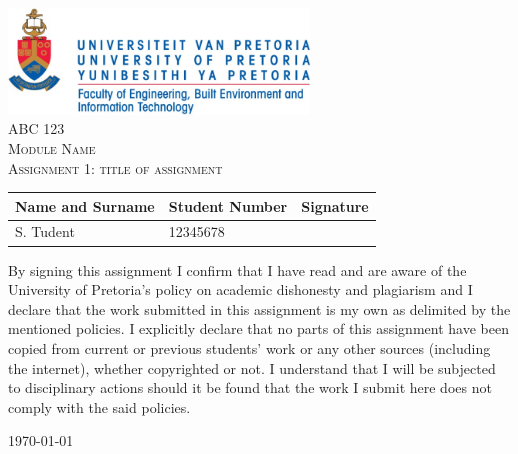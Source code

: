 \begin{titlepage}
	\begin{center}
	
		\includegraphics[width=0.6\textwidth]{./up_logo_doc.jpg}\\[2.0cm]    
	
		\textsc{\LARGE ABC 123}\\[1.0cm]
	
		\textsc{\Large Module Name}\\[0.75cm]

		\textsc{Assignment 1: title of assignment}\\[1.0cm]
		
		\begin{table}[H]
			\centering
			\begin{tabular}{|m{5cm}|m{4cm}|m{4cm}|}
				\hline
				\multicolumn{1}{|c|}{\textbf{Name and Surname}} 	&
				\multicolumn{1}{c|}{\textbf{Student Number}} 		&
				\multicolumn{1}{c|}{\textbf{Signature}} 			\\
				\hline
				S. Tudent & 12345678 & \\[0.75cm]
				\hline
			\end{tabular}
		\end{table}
		
	\end{center}

	\noindent By signing this assignment I confirm that I have read and are aware of the University of Pretoria's policy on academic dishonesty and plagiarism and I declare that the work submitted in this assignment is my own as delimited by the mentioned policies. I explicitly declare that no parts of this assignment have been copied from current or previous students' work or any other sources (including the internet), whether copyrighted or not. I understand that I will be subjected to disciplinary actions should it be found that the work I submit here does not comply with the said policies.

	\begin{center}

		\vfill

		{\large \today}
		
	\end{center}
	
\end{titlepage}